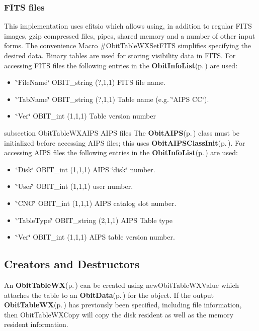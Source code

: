 \subsubsection{FITS files}\label{ObitTableWX_8h_TableFITS}
This implementation uses cfitsio which allows using, in addition to regular FITS images, gzip compressed files, pipes, shared memory and a number of other input forms. The convenience Macro \#Obit\-Table\-WXSet\-FITS simplifies specifying the desired data. Binary tables are used for storing visibility data in FITS. For accessing FITS files the following entries in the {\bf Obit\-Info\-List}{\rm (p.\,\pageref{structObitInfoList})} are used: \begin{itemize}
\item \char`\"{}File\-Name\char`\"{} OBIT\_\-string (?,1,1) FITS file name. \item \char`\"{}Tab\-Name\char`\"{} OBIT\_\-string (?,1,1) Table name (e.g. \char`\"{}AIPS CC\char`\"{}). \item \char`\"{}Ver\char`\"{} OBIT\_\-int (1,1,1) Table version number\end{itemize}
subsection Obit\-Table\-WXAIPS AIPS files The {\bf Obit\-AIPS}{\rm (p.\,\pageref{structObitAIPS})} class must be initialized before accessing AIPS files; this uses {\bf Obit\-AIPSClass\-Init}{\rm (p.\,\pageref{ObitAIPS_8c_a5})}. For accessing AIPS files the following entries in the {\bf Obit\-Info\-List}{\rm (p.\,\pageref{structObitInfoList})} are used: \begin{itemize}
\item \char`\"{}Disk\char`\"{} OBIT\_\-int (1,1,1) AIPS \char`\"{}disk\char`\"{} number. \item \char`\"{}User\char`\"{} OBIT\_\-int (1,1,1) user number. \item \char`\"{}CNO\char`\"{} OBIT\_\-int (1,1,1) AIPS catalog slot number. \item \char`\"{}Table\-Type\char`\"{} OBIT\_\-string (2,1,1) AIPS Table type \item \char`\"{}Ver\char`\"{} OBIT\_\-int (1,1,1) AIPS table version number.\end{itemize}
\subsection{Creators and Destructors}\label{ObitTableWX_8h_ObitTableWXaccess}
An {\bf Obit\-Table\-WX}{\rm (p.\,\pageref{structObitTableWX})} can be created using new\-Obit\-Table\-WXValue which attaches the table to an {\bf Obit\-Data}{\rm (p.\,\pageref{structObitData})} for the object. If the output {\bf Obit\-Table\-WX}{\rm (p.\,\pageref{structObitTableWX})} has previously been specified, including file information, then Obit\-Table\-WXCopy will copy the disk resident as well as the memory resident information.

